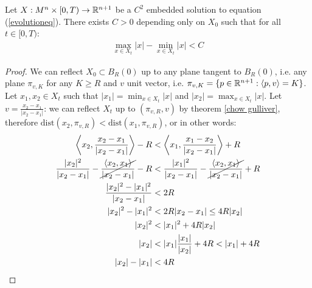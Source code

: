 \begin{cor}
	Let $X:M^n\times [0,T) \rightarrow \mathbb{R}^{n+1}$ be a $C^2$ embedded solution to equation (\ref{evolutioneq}). There exists $C>0$ depending only on $X_0$ such that for all $t\in[0, T)$: 
	\begin{align*}
		\max_{x\in X_t} |x| - \min_{x\in X_t} |x| < C
	\end{align*}
\end{cor}
\begin{proof}
	We can reflect $X_0\subset B_R(0)$ up to any plane tangent to  $B_R(0)$, i.e. any plane $\pi_{v, K}$ for any $K\geq R$ and $v$ unit vector, i.e.  $\pi_{v, K}=\{p \in \mathbb{R}^{n+1} : \langle p, v \rangle = K\}$. Let $x_1, x_2\in X_t$ such that $|x_1|=\min_{x\in X_t} |x|$ and  $|x_2|=\max_{x\in X_t} |x|$. Let $v=\frac{x_2-x_1}{\vert x_2-x_1 \vert}$: we can reflect $X_t$ up to $(\pi_{v, R}, v)$ by theorem \ref{chow gulliver}, therefore $\mathrm{dist}(x_2, \pi_{v, R}) < \mathrm{dist}(x_1, \pi_{v, R})$, or in other words:
	\begin{align*}
		 \left\langle x_2, \frac{x_2-x_1}{\vert x_2-x_1 \vert} \right\rangle - R &< 
		 \left\langle x_1, \frac{x_1-x_2}{\vert x_2-x_1 \vert} \right\rangle + R\\
		 \frac{|x_2|^2}{\vert x_2-x_1 \vert} - \cancel{\frac{\left\langle x_2, x_1\right\rangle}{\vert x_2-x_1 \vert}}  - R &< 
		 \frac{\vert x_1\vert^2}{\vert x_2-x_1 \vert} - \cancel{\frac{\left\langle x_2, x_1\right\rangle}{\vert x_2-x_1 \vert}}  + R\\
		 \frac{|x_2|^2 - |x_1|^2}{\vert x_2-x_1 \vert} &< 
		  2R\\
		  |x_2|^2 - |x_1|^2 &< 
		  2R \vert x_2-x_1 \vert \leq 4R |x_2|\\
		  |x_2|^2 &<|x_1|^2 + 4R |x_2|\\
		  |x_2| &< |x_1| \frac{|x_1|}{|x_2|} + 4R < |x_1| + 4R\\
		  |x_2| -|x_1| &<4R
	\end{align*}
\end{proof}



